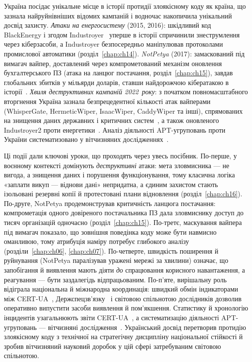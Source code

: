 Україна посідає унікальне місце в історії протидії злоякісному коду як країна, що зазнала найруйнівніших відомих кампаній і водночас накопичила унікальний досвід захисту. \emph{Атаки на енергосистему} (2015, 2016): шкідливий код BlackEnergy і згодом Industroyer~\cite{industroyer} уперше в історії спричинили знеструмлення через кіберзасоби, а Industroyer безпосередньо маніпулював протоколами промислової автоматики (розділ~\ref{chap:ch14}). \emph{NotPetya} (2017): замаскований під вимагач вайпер, доставлений через компрометований механізм оновлення бухгалтерського ПЗ (атака на ланцюг постачання, розділ~\ref{chap:ch15}), завдав глобальних збитків у мільярди доларів, ставши найдорожчою кібератакою в історії~\cite{notpetya,ch01:greenberg}. \emph{Хвиля деструктивних кампаній 2022~року}: з початком повномасштабного вторгнення Україна зазнала безпрецедентної кількості атак вайперами (WhisperGate, HermeticWiper, IsaacWiper, CaddyWiper та інші), спрямованих на знищення даних державних і критичних систем~\cite{wipers2022}, а також оновленого Industroyer2 проти енергетики~\cite{industroyer2}. Аналіз діяльності APT-угруповань проти України систематизовано у вітчизняних дослідженнях~\cite{ch01:apt-ua}.

Ці події дали ключові уроки, що проходять через увесь посібник. По-перше, у воєнному контексті домінують \emph{деструктивні} атаки: мета зловмисника --- не вигода, а знищення даних і порушення функціонування, тому класична логіка «заплати викуп --- віднови дані» непридатна, а єдиним захистом стають ізольовані резервні копії й протестовані плани відновлення (розділ~\ref{chap:ch16}). По-друге, NotPetya продемонстрував критичність ланцюга постачання: компрометація одного довіреного постачальника ПЗ дала зловмиснику доступ до тисяч організацій одночасно (розділ~\ref{chap:ch15}). По-третє, маскування вайпера під вимагач показало, що зовнішня поведінка коду може бути навмисно оманливою, тому атрибуція наміру потребує глибокого аналізу (розділи~\ref{chap:ch06}, \ref{chap:ch07}). По-четверте, швидкість поширення й руйнування (NotPetya паралізував уражені мережі за хвилини) означає, що запобігання й виявлення мають діяти \emph{до} спрацювання корисного навантаження, а реагування --- бути заздалегідь відпрацьованим. По-п'яте, вирішальну роль відіграла національна й міжнародна координація: швидкий обмін індикаторами між CERT-UA~\cite{cert-ua}, Держспецзв'язку~\cite{cip} і світовою спільнотою дослідників дозволив оперативно випустити засоби виявлення й пом'якшення. Статистику й хронологію інцидентів узагальнюють звіти CERT-UA~\cite{ch01:cert-report}, а систематизацію діяльності APT-угруповань --- вітчизняні дослідження~\cite{ch01:apt-ua}. Український досвід перетворив протидію злоякісному коду з технічної на стратегічну дисципліну національної стійкості й зробив вітчизняний науковий доробок у цій сфері затребуваним світовою спільнотою.

